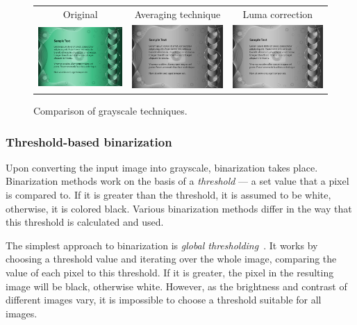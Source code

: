 \begin{figure}[t]
\centering
{\sffamily
\begin{tabular}{ccc}
Original & Averaging technique & Luma correction \\
\includegraphics[width=.28\linewidth]{img/preprocessing/grayscale_orig.jpg}
&
\includegraphics[width=.28\linewidth]{img/preprocessing/grayscale_avg.png}
&
\includegraphics[width=.28\linewidth]{img/preprocessing/grayscale_luma.png}
\end{tabular}
}
\caption{Comparison of grayscale techniques.}
\label{fig:preprocessGrayscale}
\end{figure}

\subsubsection{Threshold-based binarization}
Upon converting the input image into grayscale, binarization takes place. Binarization methods work on the basis of a \emph{threshold} --- a set value that a pixel is compared to. If it is greater than the threshold, it is assumed to be white, otherwise, it is colored black. Various binarization methods differ in the way that this threshold is calculated and used.

The simplest approach to binarization is \emph{global thresholding}~\citep{globalThresh}. It works by choosing a threshold value and iterating over the whole image, comparing the value of each pixel to this threshold. If it is greater, the pixel in the resulting image will be black, otherwise white. However, as the brightness and contrast of different images vary, it is impossible to choose a threshold suitable for all images.

